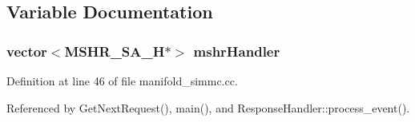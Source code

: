 \subsection{Variable Documentation}
\subsubsection[{mshrHandler}]{\setlength{\rightskip}{0pt plus 5cm}vector$<${\bf MSHR\_\-SA\_\-H}$\ast$$>$ {\bf mshrHandler}}\label{manifold__simmc_8cc_1fc79726402dfb84d1bfc19aaf5dc776}




Definition at line 46 of file manifold\_\-simmc.cc.

Referenced by GetNextRequest(), main(), and ResponseHandler::process\_\-event().